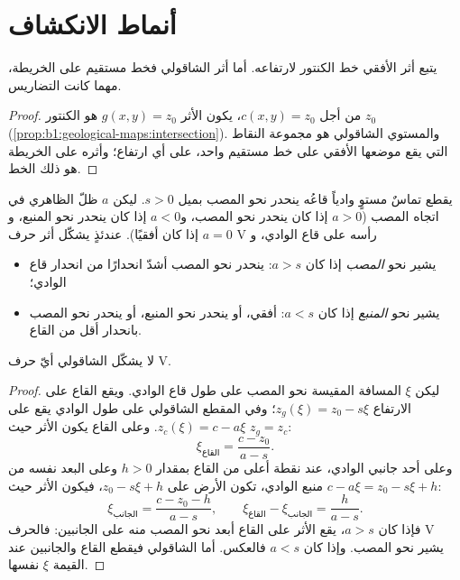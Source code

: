\section{أنماط الانكشاف}

\begin{proposition}\label{prop:b1:geological-maps:hv}
يتبع أثر  الأفقي خط الكنتور لارتفاعه. أما أثر  الشاقولي فخط مستقيم على الخريطة، مهما كانت التضاريس.
\end{proposition}

\begin{proof}
من أجل $c(x,y) = z_0$، يكون الأثر $g(x,y) = z_0$ هو الكنتور $z_0$ (\cref{prop:b1:geological-maps:intersection}). والمستوي الشاقولي هو مجموعة النقاط التي يقع موضعها الأفقي على خط مستقيم واحد، على أي ارتفاع؛ وأثره على الخريطة هو ذلك الخط.
\end{proof}

\begin{theorem}[قاعدة V]\label{thm:b1:geological-maps:v-rule}
يقطع تماسٌ مستوٍ وادياً قاعُه ينحدر نحو المصب بميل $s > 0$. ليكن $a$ ظلّ  الظاهري  في اتجاه المصب ($a > 0$ إذا كان ينحدر نحو المصب، و$a < 0$ إذا كان ينحدر نحو المنبع، و$a = 0$ إذا كان أفقيًا). عندئذٍ يشكّل أثر  حرف V رأسه على قاع الوادي، و
\begin{itemize}
  \item يشير نحو \emph{المصب} إذا كان $a > s$:  ينحدر نحو المصب أشدّ انحدارًا من انحدار قاع الوادي؛
  \item يشير نحو \emph{المنبع} إذا كان $a < s$:  أفقي، أو ينحدر نحو المنبع، أو ينحدر نحو المصب بانحدار أقل من القاع.
\end{itemize}
لا يشكّل  الشاقولي أيّ حرف V.
\end{theorem}

\begin{proof}
ليكن $\xi$ المسافة المقيسة نحو المصب على طول قاع الوادي. ويقع القاع على الارتفاع $z_g(\xi) = z_0 - s\xi$؛ وفي المقطع الشاقولي على طول الوادي يقع  على $z_c(\xi) = c - a\xi$. وعلى القاع يكون الأثر حيث $z_g = z_c$:
\[
  \xi_{\text{القاع}} = \frac{c - z_0}{a - s}.
\]
وعلى أحد جانبي الوادي، عند نقطة أعلى من القاع بمقدار $h > 0$ وعلى البعد نفسه من منبع الوادي، تكون الأرض على $z_0 - s\xi + h$، فيكون الأثر حيث $c - a\xi = z_0 - s\xi + h$:
\[
  \xi_{\text{الجانب}} = \frac{c - z_0 - h}{a - s}, \qquad
  \xi_{\text{القاع}} - \xi_{\text{الجانب}} = \frac{h}{a - s}.
\]
فإذا كان $a > s$، يقع الأثر على القاع أبعد نحو المصب منه على الجانبين: فالحرف V يشير نحو المصب. وإذا كان $a < s$ فالعكس. أما  الشاقولي فيقطع القاع والجانبين عند القيمة $\xi$ نفسها.
\end{proof}

